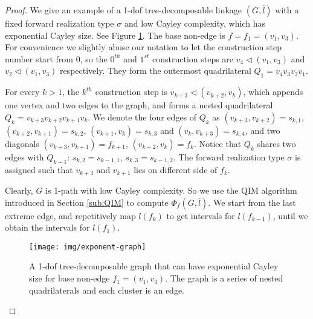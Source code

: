\documentclass[secthm,amsthm,english]{article}
\theoremstyle{definition}
\theoremstyle{remark}
\begin{document}
\begin{proof}
We give an example of a 1-dof tree-decomposable linkage $(G, \bar{l})$
with a fixed forward realization type $\sigma$ and low Cayley complexity, 
which has exponential Cayley size. 
See Figure \ref{F:exponent-graph}. 
The base non-edge is $f = f_{1}=(v_{1},v_{3})$.
For convenience we slightly abuse our notation to let 
the construction step number start from $0$, 
so the $0^{th}$ and $1^{st}$ construction steps are 
$v_{4}\triangleleft(v_{1},v_{3})$
and $v_{2}\triangleleft(v_{1},v_{3})$ respectively. 
They form the outermost quadrilateral $Q_{1}=v_{4}v_{3}v_{2}v_{1}$.

For every $k>1$, 
the $k^{th}$ construction step  is $v_{k+3}\triangleleft(v_{k+2},v_{k})$,
which appends one vertex and two edges to the graph, and forms a nested
quadrilateral $Q_{k}=v_{k+3}v_{k+2}v_{k+1}v_{k}$. 
We denote the four
edges of $Q_{k}$ as $(v_{k+3},v_{k+2})=s_{k,1}$, $(v_{k+2},v_{k+1})=s_{k,2}$,
$(v_{k+1},v_{k})=s_{k,3}$ and $(v_{k},v_{k+3})=s_{k,4}$, 
and two diagonals $(v_{k+3},v_{k+1})=f_{k+1}$, $(v_{k+2},v_{k})=f_{k}$.
Notice that $Q_{k}$ shares two edges with $Q_{k-1}$: $s_{k,2}=s_{k-1,1}$, $s_{k,3}=s_{k-1,2}$.
The forward realization type $\sigma$ is assigned such that $v_{k+3}$ and $v_{k+1}$ lies on
different side of $f_{k}$. 

Clearly, $G$ is 1-path with low Cayley complexity. 
So we use the QIM algorithm introduced in Section
\ref{sub:QIM} to compute $\Phi_{f}(G,\bar{l})$. 
We start from the last extreme edge, 
and repetitively map $l(f_k)$ to get intervals for $l(f_{k-1})$, 
until we obtain the intervals for $l(f_1)$. 

\begin{figure}[h]
	
	\begin{centering}
	\texttt{[image: img/exponent-graph]}
	\par\end{centering}
	
	\caption{A 1-dof tree-decomposable
	graph that can have exponential Cayley size for base non-edge $f_{1}=(v_{1},v_{3})$.
	The graph is a series of nested quadrilaterals and each cluster is
	an edge.}


\label{F:exponent-graph} 
\end{figure}


\end{proof}
\end{document}
